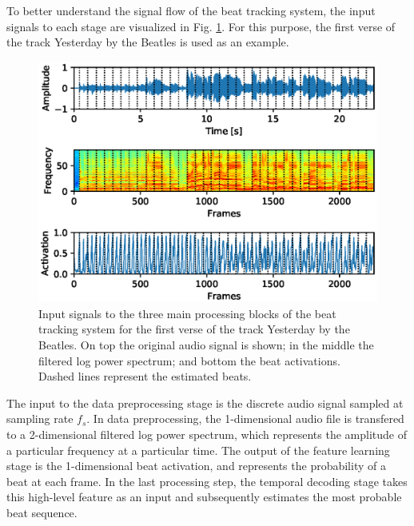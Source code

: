 \documentclass{scrartcl}
\begin{document}
To better understand the signal flow of the beat tracking system, the input signals to each stage are visualized in Fig. \ref{fig:pipeline}. For this purpose, the first verse of the track Yesterday by the Beatles is used as an example.
\begin{figure}[htbp]
\centering
\includegraphics[scale=0.82,trim={0.4cm 0.4cm 0cm 0.2cm},clip]{figures/pipeline.eps}
\caption{Input signals to the three main processing blocks of the beat tracking system for the first verse of the track Yesterday by the Beatles. On top the original audio signal is shown; in the middle the filtered log power spectrum; and bottom the beat activations. Dashed lines represent the estimated beats.}
\label{fig:pipeline}
\end{figure}
The input to the data preprocessing stage is the discrete audio signal sampled at sampling rate $f_s$. In data preprocessing, the 1-dimensional audio file is transfered to a 2-dimensional filtered log power spectrum, which represents the amplitude of a particular frequency at a particular time. The output of the feature learning stage is the 1-dimensional beat activation, and represents the probability of a beat at each frame. In the last processing step, the temporal decoding stage takes this high-level feature as an input and subsequently estimates the most probable beat sequence.
\end{document}
